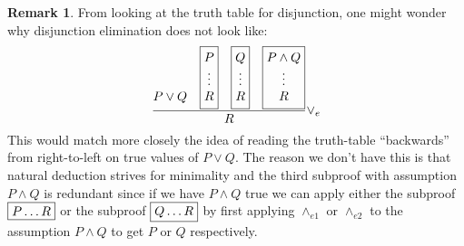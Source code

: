 \documentclass{article}
\theoremstyle{definition}
\newtheorem*{remark}{Remark}
\begin{document}
\begin{remark}
  From looking at the truth table for disjunction, one might wonder
  why disjunction elimination does not look like:
\begin{align*}
\setlength{\arraycolsep}{0em}
\dfrac{\begin{array}{c} \\ \\[0.7em] P \vee Q\end{array} \quad
\fbox{$\begin{array}{c} P \\ \vdots \\ R\end{array}$}
\quad
\fbox{$\begin{array}{c} Q \\ \vdots \\ R\end{array}$}
  \quad
  \fbox{$\begin{array}{c} P \wedge Q \\ \vdots \\ R\end{array}$}}{R}
{\vee_e}
\end{align*}
  This would match more closely the idea of reading the truth-table
  ``backwards'' from right-to-left on true values of $P \vee Q$. The
  reason we don't have this is that natural deduction strives for
  minimality and the third subproof with assumption $P \wedge Q$ is
  redundant since if we have $P \wedge Q$ true we can apply
  either the subproof $\fbox{$P \ldots R$}$ or the subproof
  $\fbox{$Q \ldots R$}$ by first applying $\wedge_{e1}$ or
  $\wedge_{e2}$ to the assumption $P \wedge Q$ to get $P$ or $Q$ respectively.

\end{remark}
\end{document}
